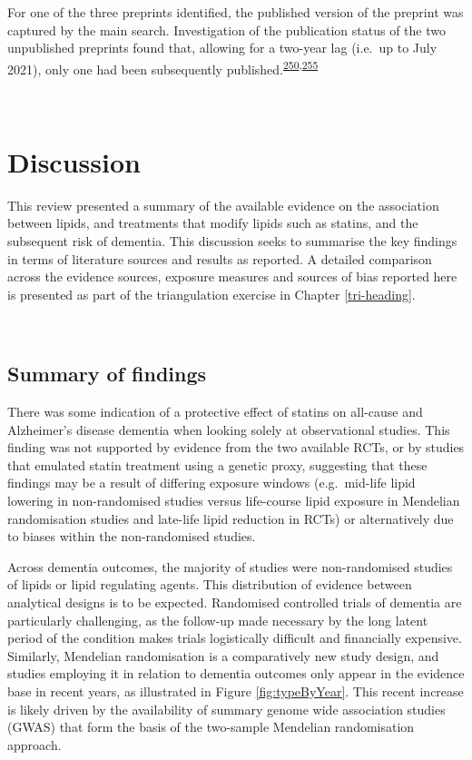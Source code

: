 \documentclass[a4paper, twoside]{templates/ociamthesis}
\begin{document}
For one of the three preprints identified, the published version of the preprint was captured by the main search. Investigation of the publication status of the two unpublished preprints found that, allowing for a two-year lag (i.e.~up to July 2021), only one had been subsequently published.\textsuperscript{\protect\hyperlink{ref-andrews2021}{250},\protect\hyperlink{ref-andrews2019}{255}}

~

\hypertarget{discussion-1}{%
\section{Discussion}\label{discussion-1}}

This review presented a summary of the available evidence on the association between lipids, and treatments that modify lipids such as statins, and the subsequent risk of dementia. This discussion seeks to summarise the key findings in terms of literature sources and results as reported. A detailed comparison across the evidence sources, exposure measures and sources of bias reported here is presented as part of the triangulation exercise in Chapter \ref{tri-heading}.

~

\hypertarget{summary-of-findings}{%
\subsection{Summary of findings}\label{summary-of-findings}}

There was some indication of a protective effect of statins on all-cause and Alzheimer's disease dementia when looking solely at observational studies. This finding was not supported by evidence from the two available RCTs, or by studies that emulated statin treatment using a genetic proxy, suggesting that these findings may be a result of differing exposure windows (e.g.~mid-life lipid lowering in non-randomised studies versus life-course lipid exposure in Mendelian randomisation studies and late-life lipid reduction in RCTs) or alternatively due to biases within the non-randomised studies.

Across dementia outcomes, the majority of studies were non-randomised studies of lipids or lipid regulating agents. This distribution of evidence between analytical designs is to be expected. Randomised controlled trials of dementia are particularly challenging, as the follow-up made necessary by the long latent period of the condition makes trials logistically difficult and financially expensive. Similarly, Mendelian randomisation is a comparatively new study design, and studies employing it in relation to dementia outcomes only appear in the evidence base in recent years, as illustrated in Figure \ref{fig:typeByYear}. This recent increase is likely driven by the availability of summary genome wide association studies (GWAS) that form the basis of the two-sample Mendelian randomisation approach.
\end{document}
